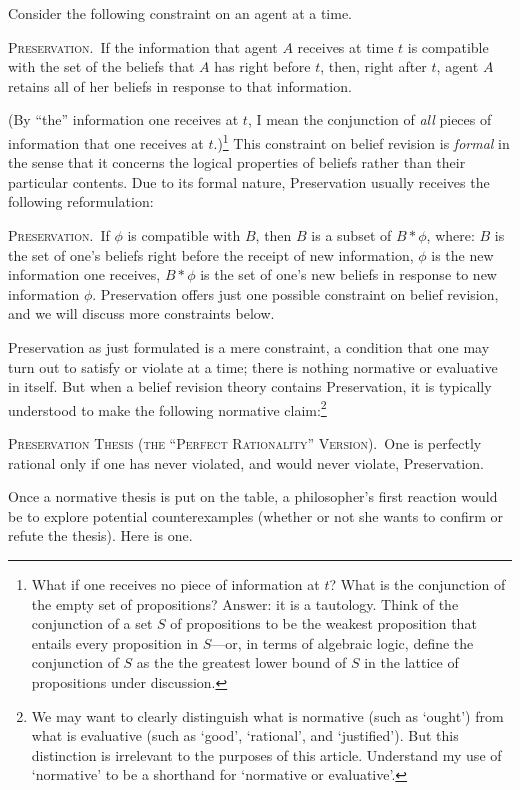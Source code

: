 Consider the following constraint on an agent at a time. \op

	\xm \textsc{Preservation.}\, If the information that agent $A$ receives at time $t$ is compatible with the set of the beliefs that $A$ has right before $t$, then, right after $t$, agent $A$ retains all of her beliefs in response to that information. 

\ed (By ``the'' information one receives at $t$, I mean the conjunction of {\em all} pieces of information that one receives at $t$.)\footnote
	{What if one receives no piece of information at $t$? What is the conjunction of the empty set of propositions? Answer: it is a tautology. Think of the conjunction of a set $S$ of propositions to be the weakest proposition that entails every proposition in $S$---or, in terms of algebraic logic, define the conjunction of $S$ as the the greatest lower bound of $S$ in the lattice of propositions under discussion.} 
This constraint on belief revision is {\em formal} in the sense that it concerns the logical properties of beliefs rather than their particular contents. Due to its formal nature, Preservation usually receives the following reformulation:\op

	\xm \textsc{Preservation.}\, If $\phi$ is compatible with $B$, then $B$ is a subset of $B * \phi$, where: \op
	\im $B$ is the set of one's beliefs right before the receipt of new information, 
	\im $\phi$ is the new information one receives,
	\im $B * \phi$ is the set of one's new beliefs in response to new information $\phi$.
	\ed
\ed Preservation offers just one possible constraint on belief revision, and we will discuss more constraints below. 

Preservation as just formulated is a mere constraint, a condition that one may turn out to satisfy or violate at a time; there is nothing normative or evaluative in itself. But when a belief revision theory contains Preservation, it is typically understood to make the following normative claim:\footnote
	{
	We may want to clearly distinguish what is normative (such as `ought') from what is evaluative (such as `good', `rational', and `justified'). But this distinction is irrelevant to the purposes of this article. Understand my use of `normative' to be a shorthand for `normative or evaluative'.
	} 
\op

	\xm \textsc{Preservation Thesis (the ``Perfect Rationality'' Version).}\, One is perfectly rational only if one has never violated, and would never violate, Preservation. 

\ed Once a normative thesis is put on the table, a philosopher's first reaction would be to explore potential counterexamples (whether or not she wants to confirm or refute the thesis). Here is one. \op 
 

